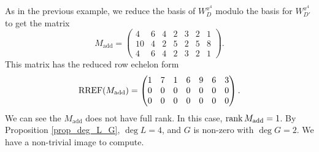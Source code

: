 As in the previous example, we reduce the basis of $W_{D}^{x^4}$ modulo the basis for $W_{D'}^{x^4}$ to get the matrix
\[ M_{\text{add}} = \begin{pmatrix}
   4 & 6 & 4 & 2 & 3 & 2 & 1 \\
  10 & 4 & 2 & 5 & 2 & 5 & 8 \\
   4 & 6 & 4 & 2 & 3 & 2 & 1
\end{pmatrix}. \]
This matrix has the reduced row echelon form
\[ \operatorname{RREF}(M_{\text{add}}) = \begin{pmatrix}
  1 & 7 & 1 & 6 & 9 & 6 & 3 \\
  0 & 0 & 0 & 0 & 0 & 0 & 0 \\
  0 & 0 & 0 & 0 & 0 & 0 & 0
\end{pmatrix}. \]
We can see the $M_{\text{add}}$ does not have full rank.
In this case, $\operatorname{rank} M_{\text{add}} = 1$.
By Proposition \ref{prop_deg_L_G},
$\deg L = 4$, and $G$ is non-zero with $\deg G = 2$.
We have a non-trivial image to compute.
\begin{comment}
\begin{align*}
  \ker M
    &= \Span \left\{ \begin{array}{l}
      g - 7f, \\
      h -  f, \\
      xf - 6f, \\
      xg - 9f, \\
      xh - 6f, \\
      x^2f - 3f \end{array} \right\} 
    = \Span \left\{ \begin{array}{l}
      xy + 4x^2 - 5y - 5x - 5, \\
      y^2 - x^2 + 2y - 2x + 1, \\
      x^3 + xy - x^2 + 5y + 4x + 5, \\
      x^2y + 2xy - x^2 + 2y + x + 2, \\
      xy^2 + 3xy - 3x^2 + 5y + 5x + 5, \\
      x^4 + x^2y + 5x^3 - 2x^2 - 3y - 4x - 3
    \end{array} \right\}.
\end{align*}
Comparing the result to Table \ref{tab_divisor_types},
$L$ is degree 4 and $I_L$ has polynomials with leading monomials $xy$, $y^2$, and $x^3$,
so $L$ must be type 41 and $I_L$ is generated by the first three polynomials.
After reducing the third polynomial modulo the first to eliminate the $xy$ term,
we have a reduced Gr\"obner basis for $I_L$,
\[ I_L = \left\langle\begin{array}{l}
      xy  + 4x^2 - 5y - 5x - 5, \\
      y^2 -  x^2 + 2y - 2x + 1, \\
      x^3 - 5x^2 -  y - 2x - 1
  \end{array}\right\rangle. \]
\end{comment}
